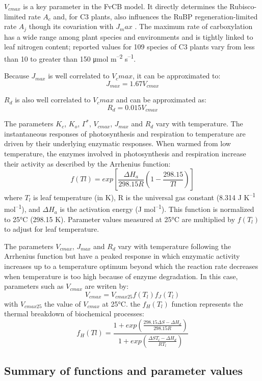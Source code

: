 \documentclass[]{article}
\begin{document}
\(V_{cmax}\) is a key parameter in the FvCB model. It directly
determines the Rubisco-limited rate \(A_c\) and, for C3 plants, also
influences the RuBP regeneration-limited rate \(A_j\) though its
covariation with \(J_max\) . The maximum rate of carboxylation has a
wide range among plant species and environments and is tightly linked to
leaf nitrogen content; reported values for 109 species of C3 plants vary
from less than 10 to greater than 150 μmol m\textsuperscript{--2}
s\textsuperscript{--1}.

Because \(J_{max}\) is well correlated to \(V_cmax\), it can be
approximated to: \[
J_{max} = 1.67V_{cmax}
\]

\(R_d\) is also well correlated to \(V_cmax\) and can be approximated
as: \[
R_d=0.015V_{cmax}
\]

The parameters \(K_c\), \(K_o\), \(\Gamma^*\), \(V_{cmax}\), \(J_{max}\)
and \(R_d\) vary with temperature. The instantaneous responses of
photosynthesis and respiration to temperature are driven by their
underlying enzymatic responses. When warmed from low temperature, the
enzymes involved in photosynthesis and respiration increase their
activity as described by the Arrhenius function: \[
f(Tl)=exp\left[\frac{\Delta H_a}{298.15R}(1-\frac{298.15}{Tl})\right]
\] where \(T_l\) is leaf temperature (in K), R is the universal gas
constant (8.314 J K\textsuperscript{--1} mol\textsuperscript{--1}), and
\(\Delta H_a\) is the activation energy (J mol\textsuperscript{--1}).
This function is normalized to 25°C (298.15 K). Parameter values
measured at 25°C are multiplied by \(f(T_l)\) to adjust for leaf
temperature.

The parameters \(V_{cmax}\), \(J_{max}\) and \(R_d\) vary with
temperature following the Arrhenius function but have a peaked response
in which enzymatic activity increases up to a temperature optimum beyond
which the reaction rate decreases when temperature is too high because
of enzyme degradation. In this case, parameters such as \(V_{cmax}\) are
writen by: \[
V_{cmax}=V_{cmax25}f(T_l)f_J(T_l)
\] with \(V_{cmax25}\) the value of \(V_{cmax}\) at 25°C. the
\(f_H(T_l)\) function represents the thermal breakdown of biochemical
processes: \[
f_H(Tl)=\frac{1+exp\left(\frac{298.15\Delta S-\Delta H_d}{298.15R}\right)}{1+exp\left(\frac{\Delta ST_l-\Delta H_d}{RT_l}\right)}
\]

\hypertarget{summary-of-functions-and-parameter-values}{%
\subsection{Summary of functions and parameter
values}\label{summary-of-functions-and-parameter-values}}
\end{document}
